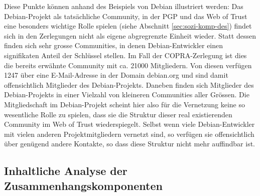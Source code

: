 Diese Punkte k\"onnen anhand des Beispiels von Debian illustriert
werden: Das Debian-Projekt als tats\"achliche Community, in der
PGP und das Web of Trust eine besonders wichtige Rolle spielen (siehe
Abschnitt \ref{sec:sozi-komp-des}) findet sich in den Zerlegungen
nicht als eigene abgregrenzte Einheit wieder. Statt dessen finden sich
sehr grosse Communities, in denen Debian-Entwickler einen signifikaten
Anteil der Schl\"ussel stellen. Im Fall der COPRA-Zerlegung ist dies
die bereits erw\"ahnte Community mit ca. 21000 Mitgliedern. Von diesen
verf\"ugen 1247 \"uber eine E-Mail-Adresse in der Domain debian.org
und sind damit offensichtlich Mitglieder des Debian-Projekts. Daneben
finden sich Mitglieder des Debian-Projekts in einer Vielzahl von
kleineren Communities aller Gr\"ossen. Die Mitgliedschaft im
Debian-Projekt scheint hier also f\"ur die Vernetzung keine so
wesentliche Rolle zu spielen, dass sie die Struktur dieser real
existierenden Community im Web of Trust wiederspiegelt. Selbst wenn viele
Debian-Entwickler mit vielen anderen Projektmitgliedern vernetzt sind,
so verf\"ugen sie offensichtlich \"uber gen\"ugend andere Kontakte,
so dass diese Struktur nicht mehr auffindbar ist.

\subsection{Inhaltliche Analyse der Zusammenhangskomponenten}
\label{sec:zusammenhangskomponenten-inhaltlich}




